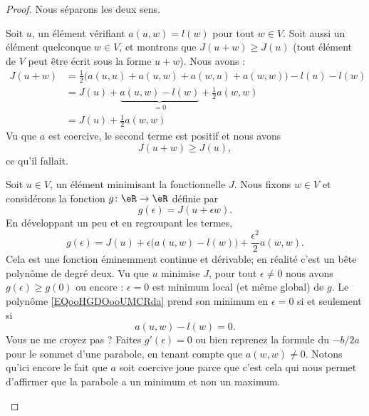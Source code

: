 \begin{proof}
	Nous séparons les deux sens.
	\begin{subproof}
		\spitem[\( \Rightarrow\)]
		Soit \( u\), un élément vérifiant \( a(u,w)=l(w)\) pour tout \( w\in V\). Soit aussi un élément quelconque \( w\in V\), et montrons que \( J(u+w)\geq J(u)\) (tout élément de \( V\) peut être écrit sous la forme \( u+w\)). Nous avons :
		\begin{subequations}
			\begin{align}
				J(u+w) & =\frac{ 1 }{2}\big( a(u,u)+a(u,w)+a(w,u)+a(w,w) \big)-l(u)-l(w) \\
				       & =J(u)+\underbrace{a(u,w)-l(w)}_{=0}+\frac{ 1 }{2}a(w,w)         \\
				       & =J(u)+\frac{ 1 }{2}a(w,w)
			\end{align}
		\end{subequations}
		Vu que \( a\) est coercive, le second terme est positif et nous avons
		\begin{equation}
			J(u+w)\geq J(u),
		\end{equation}
		ce qu'il fallait.

		\spitem[\( \Leftarrow\)]

		Soit \( u\in V\), un élément minimisant la fonctionnelle \( J\). Nous fixons \( w\in V\) et considérons la fonction \( g\colon \eR\to \eR\) définie par
		\begin{equation}
			g(\epsilon)=J(u+\epsilon w).
		\end{equation}
		En développant un peu et en regroupant les termes,
		\begin{equation}        \label{EQooHGDOooUMCRda}
			g(\epsilon)=J(u)+\epsilon\big( a(u,w)-l(w) \big)+\frac{ \epsilon^2 }{2}a(w,w).
		\end{equation}
		Cela est une fonction éminemment continue et dérivable; en réalité c'est un bête polynôme de degré deux. Vu que \( u\) minimise \( J\), pour tout \( \epsilon\neq 0\) nous avons \( g(\epsilon)\geq g(0)\) ou encore : \( \epsilon=0\) est minimum local (et même global) de \( g\). Le polynôme \eqref{EQooHGDOooUMCRda} prend son minimum en \( \epsilon=0\) si et seulement si
		\begin{equation}
			a(u,w)-l(w)=0.
		\end{equation}
		Vous ne me croyez pas ? Faites \( g'(\epsilon)=0\) ou bien reprenez la formule du \( -b/2a\) pour le sommet d'une parabole, en tenant compte que \( a(w,w)\neq 0\). Notons qu'ici encore le fait que \( a\) soit coercive joue parce que c'est cela qui nous permet d'affirmer que la parabole a un minimum et non un maximum.

	\end{subproof}
\end{proof}
